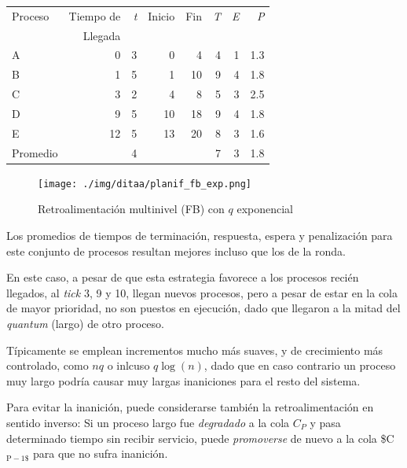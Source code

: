 \documentclass[11pt,fleqn]{book} %
\begin{document}
\begin{center}
\begin{tabular}{lrrrrrrr}
 Proceso   &  Tiempo de  &  \emph{t}  &  Inicio  &  Fin  &  \emph{T}  &  \emph{E}  &  \emph{P}  \\
           &    Llegada  &            &          &       &            &            &            \\
\hline
 A         &          0  &         3  &       0  &    4  &         4  &         1  &       1.3  \\
 B         &          1  &         5  &       1  &   10  &         9  &         4  &       1.8  \\
 C         &          3  &         2  &       4  &    8  &         5  &         3  &       2.5  \\
 D         &          9  &         5  &      10  &   18  &         9  &         4  &       1.8  \\
 E         &         12  &         5  &      13  &   20  &         8  &         3  &       1.6  \\
\hline
 Promedio  &             &         4  &          &       &         7  &         3  &       1.8  \\
\end{tabular}
\end{center}



\begin{figure}[htb]
\centering
\texttt{[image: ./img/ditaa/planif\_fb\_exp.png]}
\caption{\label{PLAN_planif_fb_exp}Retroalimentación multinivel (FB) con $q$ exponencial}
\end{figure}

Los promedios de tiempos de terminación, respuesta, espera y
penalización para este conjunto de procesos resultan mejores incluso
que los de la ronda.

En este caso, a pesar de que esta estrategia favorece a los
procesos recién llegados, al \emph{tick} 3, 9 y 10, llegan nuevos procesos,
pero a pesar de estar en la cola de mayor prioridad, no son puestos en
ejecución, dado que llegaron a la mitad del \emph{quantum} (largo) de otro
proceso.

Típicamente se emplean incrementos mucho más suaves, y de crecimiento
más controlado, como $nq$ o inlcuso $q\log(n)$, dado que en caso
contrario un proceso muy largo podría causar muy largas inaniciones
para el resto del sistema.

Para evitar la inanición, puede considerarse también la
retroalimentación en sentido inverso: Si un proceso largo fue
\emph{degradado} a la cola $C_P$ y pasa determinado tiempo sin recibir
servicio, puede \emph{promoverse} de nuevo a la cola \$C$_{\mathrm{P-1\$}}$ para que no
sufra inanición.
\end{document}
